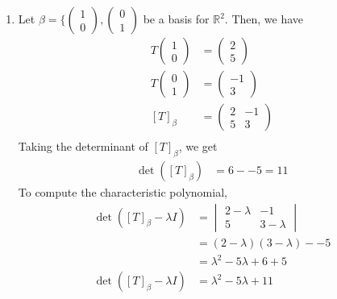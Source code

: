 \documentclass[13pt]{article}
\begin{document}
\begin{enumerate}[label=(\alph*),leftmargin=*]
\item
  Let $\beta = \{
  \begin{pmatrix}
    1 \\
    0
  \end{pmatrix},
  \begin{pmatrix}
    0 \\
    1
  \end{pmatrix}$ be a basis for $\mathbb{R}^2$. Then, we have
  \begin{align*}
    T
    \begin{pmatrix}
      1 \\
      0
    \end{pmatrix} &=
                    \begin{pmatrix}
                      2 \\
                      5
                    \end{pmatrix} \\
    T
    \begin{pmatrix}
      0 \\
      1
    \end{pmatrix} &=
                    \begin{pmatrix}
                      -1 \\
                      3
                    \end{pmatrix} \\
    [T]_\beta &=
                \begin{pmatrix}
                  2 & -1 \\
                  5 & 3
                \end{pmatrix} \\
  \end{align*}
  Taking the determinant of $[T]_\beta$, we get
  \begin{align*}
    \det([T]_\beta ) &= 6 - -5 = 11
  \end{align*}
  To compute the characteristic polynomial,
  \begin{align*}
    \det([T]_\beta - \lambda I) &=
                                  \begin{vmatrix}
                                    2 - \lambda & -1 \\
                                    5 & 3 - \lambda
                                  \end{vmatrix} \\
                                &= (2 - \lambda)(3 - \lambda) - -5 \\
                                &= \lambda^2 - 5\lambda + 6 + 5 \\
    \det([T]_\beta - \lambda I) &= \lambda^2 - 5\lambda + 11
  \end{align*}


\end{enumerate}
\end{document}
